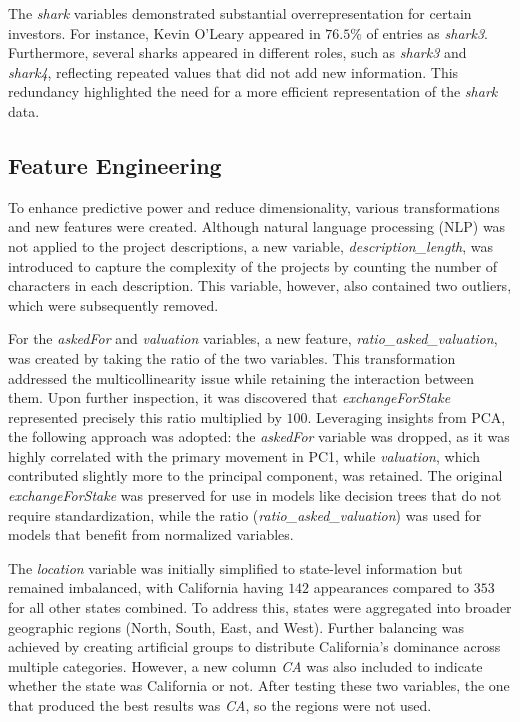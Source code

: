 \documentclass{article}
\begin{document}
The \textit{shark} variables demonstrated substantial overrepresentation for certain investors. For instance, Kevin O’Leary appeared in $76.5\%$ of entries as \textit{shark3}. Furthermore, several sharks appeared in different roles, such as \textit{shark3} and \textit{shark4}, reflecting repeated values that did not add new information. This redundancy highlighted the need for a more efficient representation of the \textit{shark} data.


\subsection{Feature Engineering}

To enhance predictive power and reduce dimensionality, various transformations and new features were created. Although natural language processing (NLP) was not applied to the project descriptions, a new variable, \textit{description\_length}, was introduced to capture the complexity of the projects by counting the number of characters in each description. This variable, however, also contained two outliers, which were subsequently removed.

For the \textit{askedFor} and \textit{valuation} variables, a new feature, \textit{ratio\_asked\_valuation}, was created by taking the ratio of the two variables. This transformation addressed the multicollinearity issue while retaining the interaction between them. Upon further inspection, it was discovered that \textit{exchangeForStake} represented precisely this ratio multiplied by $100$. Leveraging insights from PCA, the following approach was adopted: the \textit{askedFor} variable was dropped, as it was highly correlated with the primary movement in PC1, while \textit{valuation}, which contributed slightly more to the principal component, was retained. The original \textit{exchangeForStake} was preserved for use in models like decision trees that do not require standardization, while the ratio (\textit{ratio\_asked\_valuation}) was used for models that benefit from normalized variables.

The \textit{location} variable was initially simplified to state-level information but remained imbalanced, with California having $142$ appearances compared to $353$ for all other states combined. To address this, states were aggregated into broader geographic regions (North, South, East, and West). Further balancing was achieved by creating artificial groups to distribute California's dominance across multiple categories. However, a new column \textit{CA} was also included to indicate whether the state was California or not. After testing these two variables, the one that produced the best results was \textit{CA}, so the regions were not used.
\end{document}
